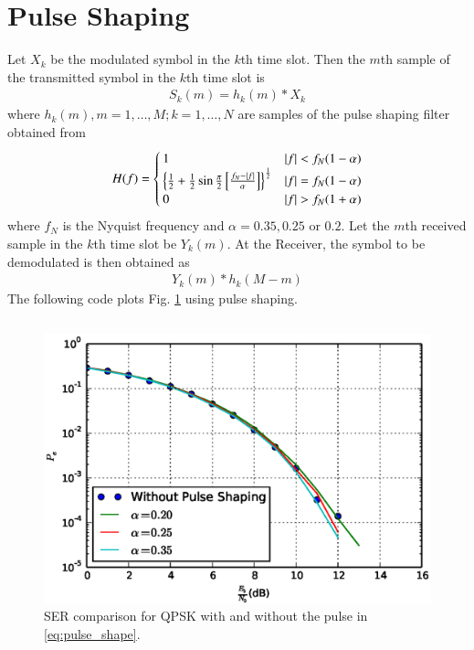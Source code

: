 \documentclass[journal,12pt,twocolumn]{IEEEtran}
\begin{document}
\section{Pulse Shaping}
Let $X_k$ be the modulated symbol in the $k$th time slot.  Then the $m$th sample of the transmitted symbol in the $k$th time slot is
\begin{align}
S_k(m)=h_k(m)* X_k
\end{align}
where $h_k(m), m=1,\dots, M; k=1,\dots,N$ are samples of the pulse shaping filter \cite{dvb}  obtained from
\begin{align}
H(f) =\begin{cases}
1& \left\vert f\right\vert<f_N(1-\alpha)\\
\left\{\frac{1}{2}+\frac{1}{2}\sin \frac{\pi}{2}{}\left[\frac{f_N-\left\vert f\right\vert}{\alpha}\right]\right\}^{\frac{1}{2}}&\left\vert f\right\vert=f_N(1-\alpha)\\
0&\left\vert f\right\vert>f_N(1+\alpha)
\end{cases}
\label{eq:pulse_shape}
\end{align}
%
where $f_N$ is the Nyquist frequency and $\alpha = 0.35, 0.25$ or $0.2$.
Let the $m$th received sample in the  $k$th time slot be $Y_k(m)$. At the Receiver, the symbol to be demodulated is then obtained as
\begin{align}
Y_k(m)*h_k(M-m)
\end{align}
The following code plots Fig. \ref{fig:pulseshaping} using pulse shaping.
\begin{lstlisting}
\end{lstlisting}
\begin{figure}[!ht]
\begin{center}
\includegraphics[width=\columnwidth]{./figs/pulseshaping}
\end{center}
\caption{SER comparison for QPSK with and without the pulse in \eqref{eq:pulse_shape}.}
\label{fig:pulseshaping}
\end{figure}
\end{document}
